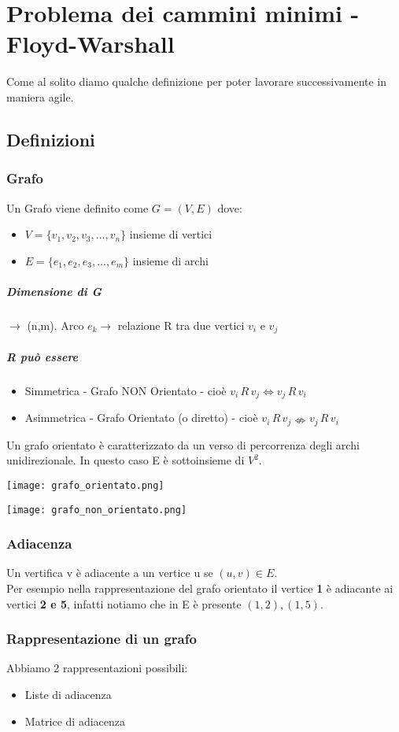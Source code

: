 \chapter{Problema dei cammini minimi - Floyd-Warshall}
Come al solito diamo qualche definizione per poter lavorare successivamente in maniera
agile.
\section{Definizioni}
\subsection{Grafo}
Un Grafo viene definito come $G=(V,E)$ dove:
\begin{itemize}
    \item $V = \{v_1,v_2,v_3,...,v_n\}$ insieme di vertici
    \item $E= \{e_1,e_2,e_3,...,e_m\}$ insieme di archi
\end{itemize}
\paragraph*{Dimensione di G} $\rightarrow$ (n,m).
Arco $e_k \rightarrow$ relazione R tra due vertici $v_i$ e $v_j$
\paragraph*{R può essere}
\begin{itemize}
    \item Simmetrica - Grafo NON Orientato - cioè $v_i \, R \, v_j \Leftrightarrow v_j \, R \, v_i$
    \item Asimmetrica - Grafo Orientato (o diretto) - cioè $v_i \, R \, v_j \nLeftrightarrow  v_j \, R \, v_i$
\end{itemize}
Un grafo orientato è caratterizzato da un verso di percorrenza degli archi unidirezionale.
In questo caso E è sottoinsieme di $V^2$.
\begin{center}
    \texttt{[image: grafo\_orientato.png]}
\end{center}
\begin{center}
    \texttt{[image: grafo\_non\_orientato.png]}
\end{center}
\subsection{Adiacenza}
Un vertifica v è adiacente a un vertice u se $(u,v)\in E$.\\
Per esempio nella rappresentazione del grafo orientato il vertice \textbf{1} è adiacante ai
vertici \textbf{2 e 5}, infatti notiamo che in E è presente $(1,2), (1,5)$.
\subsection{Rappresentazione di un grafo}
Abbiamo 2 rappresentazioni possibili:
\begin{itemize}
    \item Liste di adiacenza
    \item Matrice di adiacenza
\end{itemize}
